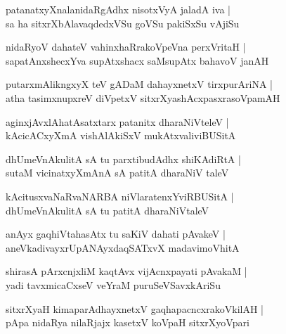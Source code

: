 \documentclass[twoside,12pt,openright]{book}
\newcounter{shloka}[chapter]
\begin{document}
\begin{shloka}
patanatxyXnalanidaRgAdhx nisotxVyA jaladA iva |\\
sa ha sitxrXbAlavaqdedxVSu goVSu pakiSxSu vAjiSu
\end{shloka}

\begin{shloka}
nidaRyoV dahateV vahinxhaRrakoVpeVna perxVritaH |\\
sapatAnxshecxYva supAtxshacx saMsupAtx bahavoV janAH
\end{shloka}

\begin{shloka}
putarxmAlikngxyX  teV gADaM dahayxnetxV tirxpurAriNA |\\
atha tasimxnupxreV diVpetxV sitxrXyashAcxpasxrasoVpamAH 
\end{shloka}

\begin{shloka}
aginxjAvxlAhatAsatxtarx patanitx dharaNiVteleV |\\
kAcicACxyXmA vishAlAkiSxV mukAtxvaliviBUSitA
\end{shloka}

\begin{shloka}
dhUmeVnAkulitA sA tu parxtibudAdhx shiKAdiRtA |\\
sutaM vicinatxyXmAnA sA patitA dharaNiV taleV 
\end{shloka}

\begin{shloka}
kAcitusxvaNaRvaNARBA niVlaratenxYviRBUSitA |\\
dhUmeVnAkulitA sA tu patitA dharaNiVtaleV 
\end{shloka}

\begin{shloka}
anAyx gaqhiVtahasAtx tu saKiV dahati pAvakeV |\\
aneVkadivayxrUpANAyxdaqSATxvX madavimoVhitA
\end{shloka}

\begin{shloka}
shirasA pArxcnjxliM kaqtAvx vijAcnxpayati pAvakaM |\\
yadi tavxmicaCxseV veYraM puruSeVSavxkAriSu
\end{shloka}

\begin{shloka}
sitxrXyaH kimaparAdhayxnetxV gaqhapacncxrakoVkilAH |\\
pApa nidaRya nilaRjajx kasetxV koVpaH sitxrXyoVpari
\end{shloka}
\end{document}
